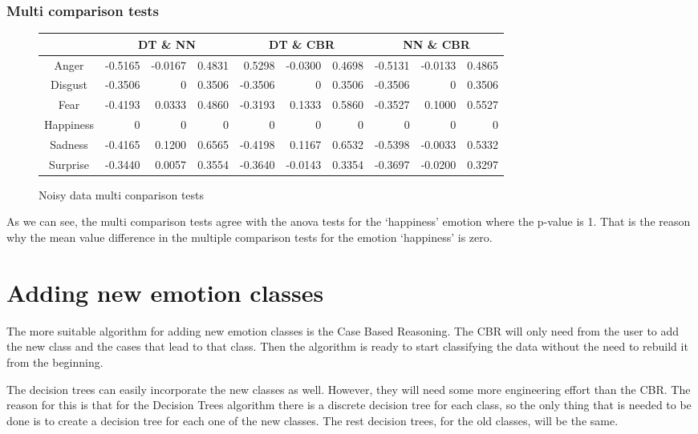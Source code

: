 \documentclass[a4paper,11pt]{article}
\begin{document}
\subsubsection{Multi comparison tests}

\begin{figure}[h]
    \begin{center}
    \begin{tabular}{|c||r|r|r|r|r|r|r|r|r|} \hline 
    & \multicolumn{3}{|c|}{DT \& NN} & \multicolumn{3}{|c|}{DT \& CBR} & \multicolumn{3}{|c|}{NN \& CBR} \\ \hline \hline
    Anger & -0.5165 & -0.0167 & 0.4831 & 0.5298 & -0.0300 & 0.4698 & -0.5131 & -0.0133 & 0.4865 \\ \hline
    Disgust & -0.3506 & 0 & 0.3506 & -0.3506 & 0 & 0.3506 & -0.3506 & 0 & 0.3506\\ \hline
    Fear & -0.4193 & 0.0333 & 0.4860 & -0.3193 & 0.1333 & 0.5860 & -0.3527 & 0.1000 & 0.5527 \\ \hline
    Happiness & 0 & 0 & 0& 0 & 0 & 0 & 0 & 0 & 0 \\ \hline
    Sadness & -0.4165 & 0.1200 & 0.6565 & -0.4198 & 0.1167 & 0.6532 & -0.5398 & -0.0033 & 0.5332 \\ \hline
    Surprise & -0.3440 & 0.0057 & 0.3554 & -0.3640 & -0.0143 & 0.3354 & -0.3697 & -0.0200 & 0.3297 \\ \hline
    \end{tabular}
    \caption{Noisy data multi conparison tests}
    \end{center}
\end{figure}

As we can see, the multi comparison tests agree with the anova tests for the
`happiness’ emotion where the p-value is 1. That is the reason why the mean
value difference in the multiple comparison tests for the emotion `happiness’
is zero. 

\section{Adding new emotion classes}

The more suitable  algorithm for adding new emotion classes is the Case Based
Reasoning. The CBR will only need from the user to add the new class and the
cases that lead to that class. Then the algorithm is ready to start classifying
the data without the need to rebuild it from the beginning.

The decision trees can easily incorporate the new classes as well. However,
they will need some more engineering effort than the CBR. The reason for this
is that for the Decision Trees algorithm there is a discrete decision tree for
each class, so the only thing that is needed to be done is to create a decision
tree for each one of the new classes. The rest decision trees, for the old
classes, will be the same. 
\end{document}
